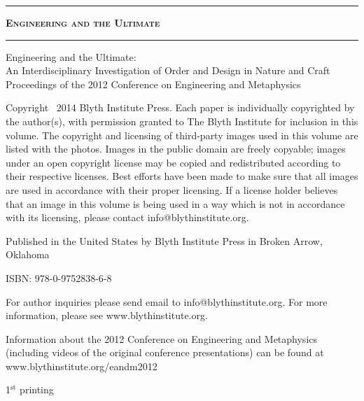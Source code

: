 \begin{titlepage}
\begingroup

\setlength{\parindent}{0cm}
\setlength{\parskip}{1em}

\vspace*{\fill}
\begin{center}
\hrule
{\LARGE \textsc{\textbf{Engineering and the Ultimate}}}
\baselineskip
\hrule
\end{center}
\vspace*{\fill}

\clearpage %

\thispagestyle{empty}
\vspace*{\fill}

{\small
Engineering and the Ultimate: \\ An Interdisciplinary Investigation of Order and Design in Nature and Craft \\ Proceedings of the 2012 Conference on Engineering and Metaphysics

Copyright \textcopyright\ 2014 Blyth Institute Press.  Each paper is individually copyrighted by the author(s), with permission granted to The Blyth Institute for inclusion in this volume.  The copyright and licensing of third-party images used in this volume are listed with the photos.  Images in the public domain are freely copyable; images under an open copyright license may be copied and redistributed according to their respective licenses.  Best efforts have been made to make sure that all images are used in accordance with their proper licensing.  If a license holder believes that an image in this volume is being used in a way which is not in accordance with its licensing, please contact info@blythinstitute.org.

Published in the United States by Blyth Institute Press in Broken Arrow, Oklahoma


ISBN: 978-0-9752838-6-8

For author inquiries please send email to info@blythinstitute.org.  For more information, please see www.blythinstitute.org.

Information about the 2012 Conference on Engineering and Metaphysics (including videos of the original conference presentations) can be found at www.blythinstitute.org/eandm2012

\baselineskip

1$^{\textrm{st}}$ printing}


\end{titlepage}

